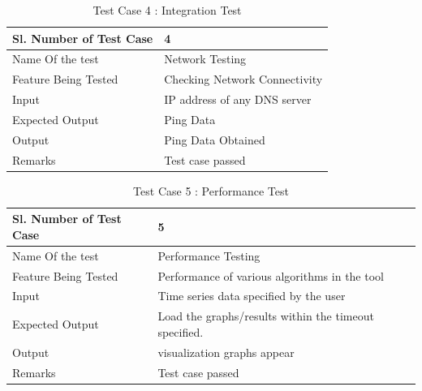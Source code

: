\documentclass[12pt,a4paper]{report}
\begin{document}
\begin{table}
    \begin{tabular}{|l|l|}
    \hline
    Sl. Number of Test Case & 4                             \\ \hline
    Name Of the test        & Network Testing               \\ \hline
    Feature Being Tested    & Checking Network Connectivity \\ \hline
    Input                   & IP address of any DNS server  \\ \hline
    Expected Output         & Ping Data                     \\ \hline
    Output                  & Ping Data Obtained            \\ \hline
    Remarks                 & Test case passed              \\ \hline
    \end{tabular}
    \caption {Test Case 4 : Integration Test}
\end{table}

\begin{table}
    \begin{tabular}{|l|l|}
    \hline
    Sl. Number of Test Case & 5                             \\ \hline
    Name Of the test        & Performance Testing               \\ \hline
    Feature Being Tested    & Performance of various algorithms in the tool\\ \hline
    Input                   & Time series data specified by the user  \\ \hline
    Expected Output         & Load the graphs/results within the timeout specified.   \\ \hline
    Output                  & visualization graphs appear           \\ \hline
    Remarks                 & Test case passed              \\ \hline
    \end{tabular}
    \caption {Test Case 5 : Performance Test}
\end{table}
\end{document}
